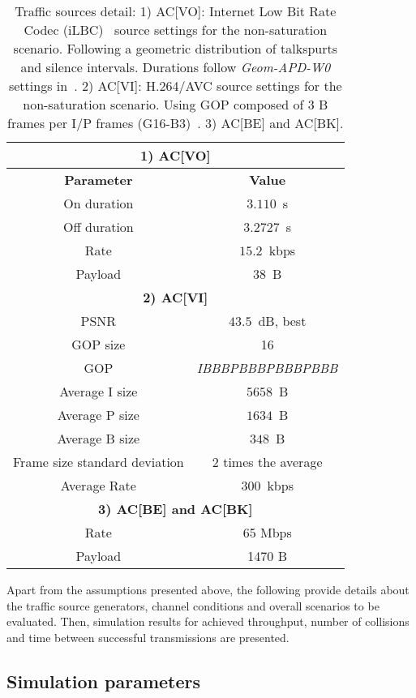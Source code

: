 \documentclass[a4paper]{article}
\begin{document}
	\begin{table}[t]
		\centering
		\caption{Traffic sources detail: 1) AC[VO]: Internet Low Bit Rate Codec (iLBC)~\cite{andersen2004internet} source settings for the non-saturation scenario. Following a geometric distribution of talkspurts and silence intervals. Durations follow \emph{Geom-APD-W0} settings in~\cite{menth2009source}. 2) AC[VI]: H.264/AVC source settings for the non-saturation scenario. Using GOP composed of 3 B frames per I/P frames (G16-B3)~\cite{menth2009source}. 3) AC[BE] and AC[BK].}
		\label{tab:voice}
		\begin{tabular}{|c|c|}
			\hline
			\multicolumn{2}{|c|}{{\bfseries 1) AC[VO]}}\\
			\hline
			{\bfseries Parameter} & {\bfseries Value}\\
			\hline
On duration & $3.110$~s\\
			Off duration & $3.2727$~s\\
			Rate & $15.2$~kbps\\
			Payload & $38$~B\\
			\hline
			\multicolumn{2}{|c|}{{\bfseries 2) AC[VI]}}\\
			\hline
			PSNR & $43.5$~dB, best\\
			GOP size & 16\\
			GOP & \emph{IBBBPBBBPBBBPBBB}\\
			Average I size & $5658$~B\\
			Average P size & $1634$~B\\
			Average B size & $348$~B\\
			Frame size standard deviation & 2 times the average\\
			Average Rate & $300$~kbps\\
			\hline
			\multicolumn{2}{|c|}{{\bfseries 3) AC[BE] and AC[BK]}}\\
			\hline
			Rate & 65 Mbps\\
			Payload & 1470 B\\
			\hline
		\end{tabular}
	\end{table}
	


Apart from the assumptions presented above, the following provide details about the traffic source generators, channel conditions and overall scenarios to be evaluated. Then, simulation results for achieved throughput, number of collisions and time between successful transmissions are presented.

\subsection{Simulation parameters}\label{subsect:simParams}
\end{document}
